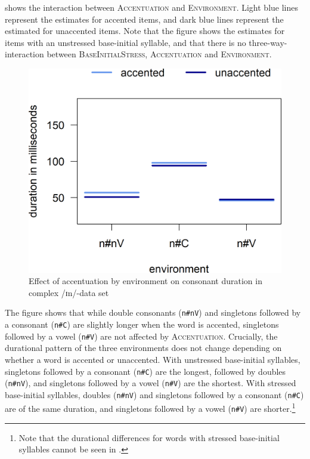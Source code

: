  	
 

 shows the interaction between \textsc{Accentuation} and \textsc{Environment}. Light blue lines represent the estimates for accented items, and dark blue lines represent the estimated for unaccented items. Note that the figure shows the estimates for items with an unstressed base-initial syllable, and that there is no three-way-interaction between \textsc{BaseInitialStress}, \textsc{Accentuation} and \textsc{Environment}. 


	


	\begin{figure} 
		
		\includegraphics [scale=0.5] {images/Experiment/InModelInterEnvAcc}
		\caption{Effect of accentuation by environment on consonant duration in complex /ɪn/-data set}
		\label{fig:Env Acc In experiment} 
	\end{figure}

\largerpage The figure shows that while double consonants (\texttt{n\#nV}) and singletons followed by a consonant (\texttt{n\#C}) are slightly longer when the word is accented, singletons followed by a vowel (\texttt{n\#V}) are not affected by \textsc{Accentuation}. Crucially, 
the durational pattern of the three environments does not change depending on whether a word is accented or unaccented. 
With unstressed base-initial syllables, singletons followed by a consonant (\texttt{n\#C}) are the longest, followed by doubles (\texttt{n\#nV}), and singletons followed by a vowel (\texttt{n\#V}) are the shortest.
With stressed base-initial syllables, doubles (\texttt{n\#nV}) and singletons followed by a consonant (\texttt{n\#C}) are of the same duration, and singletons followed by a vowel (\texttt{n\#V}) are shorter.\footnote{Note that the durational differences for words with stressed base-initial syllables cannot be seen in .}


